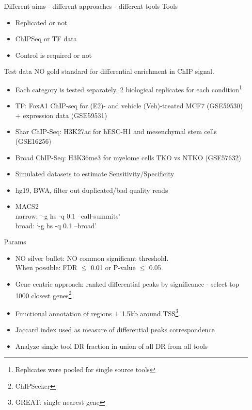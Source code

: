 \documentclass{beamer}
\begin{document}
\begin{frame}{Different aims - different approaches - different tools}
Tools
\begin{itemize}
\item Replicated or not
\item ChIPSeq or TF data
\item Control is required or not
\end{itemize}
\end{frame}

\begin{frame}{Test data}
NO gold standard for differential enrichment in ChIP signal.
\begin{itemize}
\item Each category is tested separately, 2 biological replicates for each condition\footnote{Replicates were pooled for single source tools}
\item TF: FoxA1 ChIP-seq for (E2)- and vehicle (Veh)-treated MCF7 (GSE59530) + expression data (GSE59531)
\item Shar ChIP-Seq: H3K27ac for hESC-H1 and mesenchymal stem cells (GSE16256)
\item Broad ChIP-Seq: H3K36me3 for myelome cells TKO vs NTKO (GSE57632)
\item Simulated datasets to estimate Sensitivity/Specificity
\item hg19, BWA, filter out duplicated/bad quality reads
\item MACS2 \\
narrow:  ‘-g hs -q 0.1 –call-summits’\\
broad: ‘-g hs -q 0.1 –broad’
\end{itemize}
\end{frame}

\begin{frame}{Params}
\begin{itemize}
\item NO silver bullet: NO common significant threshold. \\
When possible: FDR $\leq$ 0.01 or P-value $\leq$ 0.05.
\item Gene centric approach: ranked differential peaks by significance - select top 1000 closest genes\footnote{ChIPSeeker}
\item Functional annotation of regions $\pm$ 1.5kb around TSS\footnote{GREAT: single nearest gene}.
\item Jaccard index used as measure of differential peaks correspondence
\item Analyze single tool DR fraction in union of all DR from all tools
\end{itemize}
\end{frame}
\end{document}
